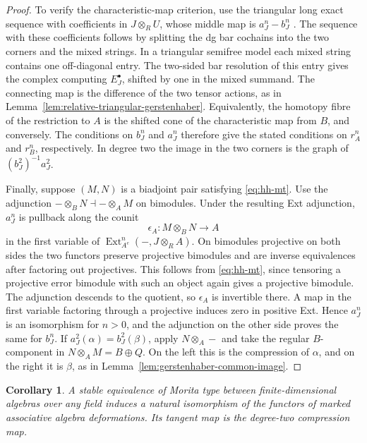 \documentclass[12pt,a4paper,english,reqno]{amsart}
\numberwithin{equation}{section}
\theoremstyle{plain}
\newtheorem*{cor-nn}{Corollary}
\theoremstyle{definition}
\begin{document}
\begin{proof}
To verify the characteristic-map criterion, use the triangular
long exact sequence with coefficients in $J\otimes_R U$,
whose middle map is $a_J^n-b_J^n$
\cite[Section~4.5]{Keller2003Higher}. The sequence with these
coefficients follows by splitting the dg bar cochains into the
two corners and the mixed strings. In a triangular semifree
model each mixed string contains one off-diagonal entry.
The two-sided bar resolution of this entry gives the complex
computing $E_J^\bullet$, shifted by one in the mixed summand.
The connecting map is the difference of the two tensor actions,
as in Lemma~\ref{lem:relative-triangular-gerstenhaber}.
Equivalently, the homotopy fibre of the restriction to $A$ is
the shifted cone of the characteristic map from $B$, and
conversely. The conditions on $b_J^n$ and $a_J^n$ therefore
give the stated conditions on $r_A^n$ and $r_B^n$, respectively.
In degree two the image in the two corners is the graph of
$(b_J^2)^{-1}a_J^2$.

Finally, suppose $(M,N)$ is a biadjoint pair satisfying
\eqref{eq:hh-mt}. Use the adjunction
$-\otimes_B N\dashv-\otimes_A M$ on bimodules. Under the
resulting Ext adjunction, $a_J^n$ is pullback along the counit
\[
 \epsilon_A:M\otimes_B N\longrightarrow A
\]
in the first variable of $\operatorname{Ext}_{A^e}^n(-,J\otimes_R A)$.
On bimodules projective on both sides the two functors preserve
projective bimodules and are inverse equivalences after factoring
out projectives. This follows from \eqref{eq:hh-mt}, since
tensoring a projective error bimodule with such an object
again gives a projective bimodule. The adjunction descends to
the quotient, so $\epsilon_A$ is invertible there. A map in
the first variable factoring through a projective induces
zero in positive Ext. Hence $a_J^n$ is an isomorphism for
$n>0$, and the adjunction on the other side proves the same
for $b_J^n$. If $a_J^2(\alpha)=b_J^2(\beta)$, apply
$N\otimes_A-$ and take the regular $B$-component in
$N\otimes_A M=B\oplus Q$. On the left this is the compression
of $\alpha$, and on the right it is $\beta$, as in
Lemma~\ref{lem:gerstenhaber-common-image}.
\end{proof}

\begin{cor-nn}
A stable equivalence of Morita type between finite-dimensional
algebras over any field induces a natural isomorphism of the
functors of marked associative algebra deformations. Its
tangent map is the degree-two compression map.
\end{cor-nn}
\end{document}
